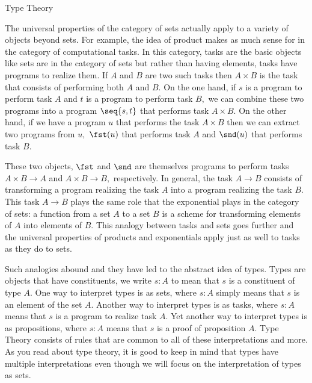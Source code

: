 \begin{unit}{Type Theory}

The universal properties of the category of sets actually apply to a variety of objects beyond sets.
For example, the idea of product makes as much sense for in the category of computational tasks.
In this category, tasks are the basic objects like sets are in the category of sets but rather than having elements, tasks have programs to realize them.
If \(A\) and \(B\) are two such tasks then \(A \times B\) is the task that consists of performing both \(A\) and \(B.\)
On the one hand, if \(s\) is a program to perform task \(A\) and \(t\) is a program to perform task \(B,\) we can combine these two programs into a program \(\seq{s,t}\) that performs task \(A \times B.\) 
On the other hand, if we have a program \(u\) that performs the task \(A \times B\) then we can extract two programs from \(u,\) \(\fst(u)\) that performs task \(A\) and \(\snd(u)\) that performs task \(B.\)

These two objects, \(\fst\) and \(\snd\) are themselves programs to perform tasks \(A \times B \to A\) and \(A \times B \to B,\) respectively.
In general, the task \(A \to B\) consists of transforming a program realizing the task \(A\) into a program realizing the task \(B.\)
This task \(A \to B\) plays the same role that the exponential plays in the category of sets: a function from a set \(A\) to a set \(B\) is a scheme for transforming elements of \(A\) into elements of \(B.\)
This analogy between tasks and sets goes further and the universal properties of products and exponentials apply just as well to tasks as they do to sets.

Such analogies abound and they have led to the abstract idea of types.
Types are objects that have constituents, we write \(s:A\) to mean that \(s\) is a constituent of type \(A.\)
One way to interpret types is as sets, where \(s:A\) simply means that \(s\) is an element of the set \(A.\)
Another way to interpret types is as tasks, where \(s:A\) means that \(s\) is a program to realize task \(A.\)
Yet another way to interpret types is as propositions, where \(s:A\) means that \(s\) is a proof of proposition \(A.\)
Type Theory consists of rules that are common to all of these interpretations and more.
As you read about type theory, it is good to keep in mind that types have multiple interpretations even though we will focus on the interpretation of types as sets.


\end{unit}
